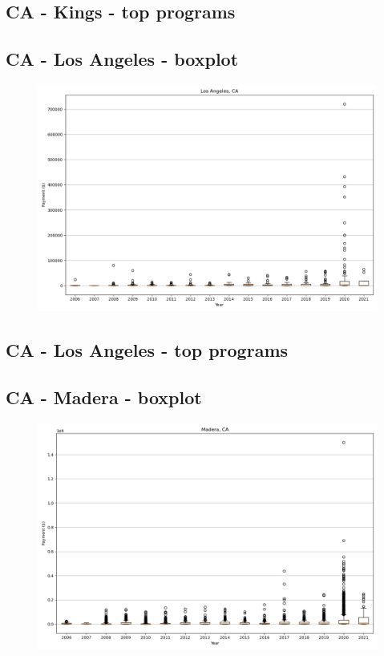 \subsection*{CA - Kings - top programs}

\newpage
\subsection*{CA - Los Angeles - boxplot}
\begin{figure}[h]
\centering
\includegraphics[width=7in]{../output/boxplots/counties/Los Angeles-CA_boxplot.png}
\end{figure}


\subsection*{CA - Los Angeles - top programs}

\newpage
\subsection*{CA - Madera - boxplot}
\begin{figure}[h]
\centering
\includegraphics[width=7in]{../output/boxplots/counties/Madera-CA_boxplot.png}
\end{figure}


